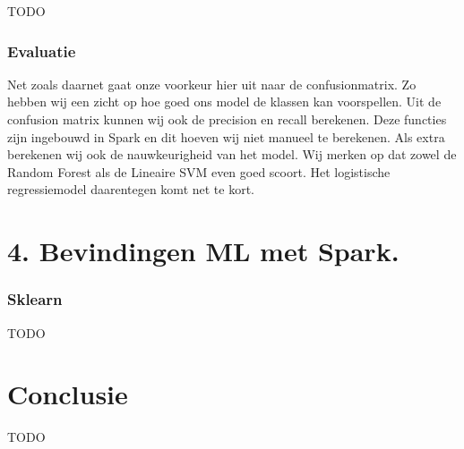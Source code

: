 \documentclass[a4paper,10pt,twoside]{report}
\begin{document}
TODO

\subsection*{Evaluatie}

Net zoals daarnet gaat onze voorkeur hier uit naar de confusionmatrix. Zo hebben wij een zicht op hoe goed ons model de klassen kan voorspellen. Uit de confusion matrix kunnen wij ook de precision en recall berekenen. Deze functies zijn ingebouwd in Spark en dit hoeven wij niet manueel te berekenen. Als extra berekenen wij ook de nauwkeurigheid van het model. Wij merken op dat zowel de Random Forest als de Lineaire SVM even goed scoort. Het logistische regressiemodel daarentegen komt net te kort.

\chapter*{4. Bevindingen ML met Spark.}

\subsection*{Sklearn}

TODO

\chapter*{Conclusie}

TODO

\appendix
\end{document}
